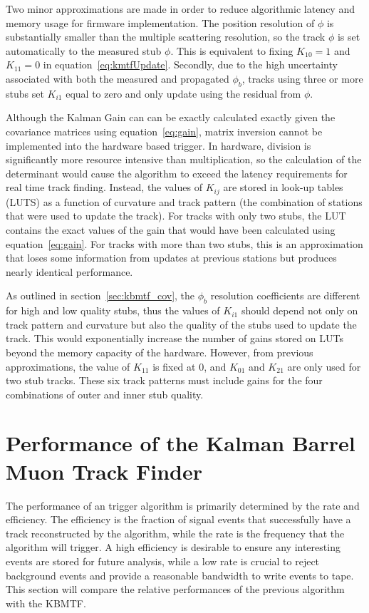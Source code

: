 Two minor approximations are made in order to reduce algorithmic latency and memory usage for firmware implementation. The position resolution of $\phi$ is substantially smaller than the multiple scattering resolution, so the track $\phi$ is set automatically to the measured stub $\phi$. This is equivalent to fixing $K_{10}=1$ and $K_{11}=0$ in equation~\ref{eq:kmtfUpdate}. Secondly, due to the high uncertainty associated with both the measured and propagated $\phi_b$, tracks using three or more stubs set $K_{i1}$ equal to zero and only update using the residual from $\phi$. 

Although the Kalman Gain can can be exactly calculated exactly given the covariance matrices using equation~\ref{eq:gain}, matrix inversion cannot be implemented into the hardware based trigger. In hardware, division is significantly more resource intensive than multiplication, so the calculation of the determinant would cause the algorithm to exceed the latency requirements for real time track finding. Instead, the values of $K_{ij}$ are stored in look-up tables (LUTS) as a function of curvature and track pattern (the combination of stations that were used to update the track). For tracks with only two stubs, the LUT contains the exact values of the gain that would have been calculated using equation~\ref{eq:gain}. For tracks with more than two stubs, this is an approximation that loses some information from updates at previous stations but produces nearly identical performance.

As outlined in section~\ref{sec:kbmtf_cov}, the $\phi_b$ resolution coefficients are different for high and low quality stubs, thus the values of $K_{i1}$ should depend not only on track pattern and curvature but also the quality of the stubs used to update the track. This would exponentially increase the number of gains stored on LUTs beyond the memory capacity of the hardware. However, from previous approximations, the value of $K_{11}$ is fixed at 0, and $K_{01}$ and $K_{21}$ are only used for two stub tracks. These six track patterns must include gains for the four combinations of outer and inner stub quality.

\section{Performance of the Kalman Barrel Muon Track Finder} \label{sec:kmtf_performance}
The performance of an trigger algorithm is primarily determined by the rate and efficiency. The efficiency is the fraction of signal events that successfully have a track reconstructed by the algorithm, while the rate is the frequency that the algorithm will trigger. A high efficiency is desirable to ensure any interesting events are stored for future analysis, while a low rate is crucial to reject background events and provide a reasonable bandwidth to write events to tape. This section will compare the relative performances of the previous algorithm with the KBMTF.

